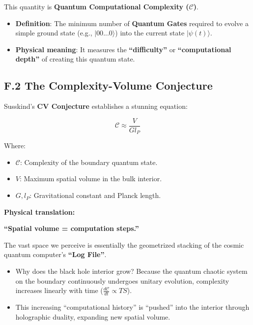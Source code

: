 This quantity is \textbf{Quantum Computational Complexity ($\mathcal{C}$)}.

\begin{itemize}
\item \textbf{Definition}: The minimum number of \textbf{Quantum Gates} required to evolve a simple ground state (e.g., $|00...0\rangle$) into the current state $|\psi(t)\rangle$.

\item \textbf{Physical meaning}: It measures the \textbf{``difficulty''} or \textbf{``computational depth''} of creating this quantum state.
\end{itemize}

\subsection{F.2 The Complexity-Volume Conjecture}

Susskind's \textbf{CV Conjecture} establishes a stunning equation:

\[\mathcal{C} \approx \frac{V}{G l_P}\]

Where:

\begin{itemize}
\item \textbf{$\mathcal{C}$}: Complexity of the boundary quantum state.

\item \textbf{$V$}: Maximum spatial volume in the bulk interior.

\item \textbf{$G, l_P$}: Gravitational constant and Planck length.
\end{itemize}

\textbf{Physical translation:}

\textbf{``Spatial volume = computation steps.''}

The vast space we perceive is essentially the geometrized stacking of the cosmic quantum computer's \textbf{``Log File''}.

\begin{itemize}
\item Why does the black hole interior grow? Because the quantum chaotic system on the boundary continuously undergoes unitary evolution, complexity increases linearly with time ($\frac{d\mathcal{C}}{dt} \propto TS$).

\item This increasing ``computational history'' is ``pushed'' into the interior through holographic duality, expanding new spatial volume.
\end{itemize}

